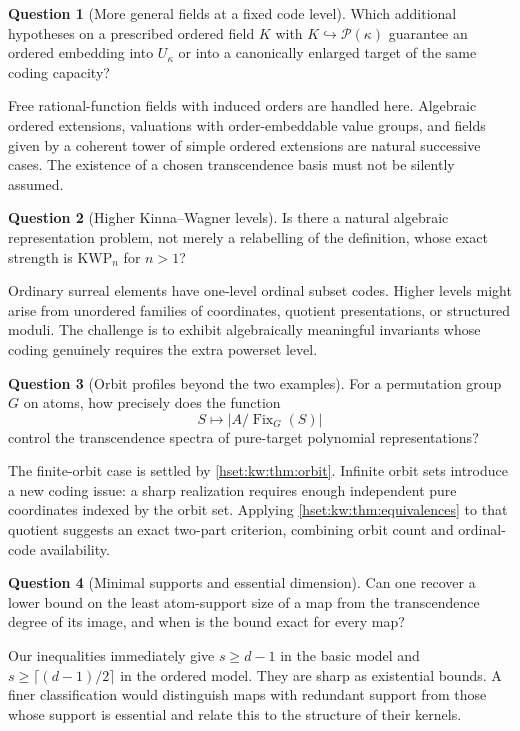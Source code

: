 \documentclass[11pt,letterpaper]{article}
\theoremstyle{definition}
\newtheorem{question}[question]{Question}\aliascntresetthe{question}
\theoremstyle{remark}
\newcommand{\Pow}{\mathcal P}
\newcommand{\KWP}{\mathrm{KWP}}
\newcommand{\Fix}{\operatorname{Fix}}
\begin{document}
\begin{question}[More general fields at a fixed code level]\label{hset:kw:q:fields}
Which additional hypotheses on a prescribed ordered field $K$ with $K\hookrightarrow\Pow(\kappa)$ guarantee an ordered embedding into $U_\kappa$ or into a canonically enlarged target of the same coding capacity?
\end{question}
Free rational-function fields with induced orders are handled here. Algebraic ordered extensions, valuations with order-embeddable value groups, and fields given by a coherent tower of simple ordered extensions are natural successive cases. The existence of a chosen transcendence basis must not be silently assumed.

\begin{question}[Higher Kinna--Wagner levels]\label{hset:kw:q:higherkw}
Is there a natural algebraic representation problem, not merely a relabelling of the definition, whose exact strength is $\KWP_n$ for $n>1$?
\end{question}
Ordinary surreal elements have one-level ordinal subset codes. Higher levels might arise from unordered families of coordinates, quotient presentations, or structured moduli. The challenge is to exhibit algebraically meaningful invariants whose coding genuinely requires the extra powerset level.

\begin{question}[Orbit profiles beyond the two examples]\label{hset:kw:q:orbitprofiles}
For a permutation group $G$ on atoms, how precisely does the function
\[
S\longmapsto |A/\Fix_G(S)|
\]
control the transcendence spectra of pure-target polynomial representations?
\end{question}
The finite-orbit case is settled by \cref{hset:kw:thm:orbit}. Infinite orbit sets introduce a new coding issue: a sharp realization requires enough independent pure coordinates indexed by the orbit set. Applying \cref{hset:kw:thm:equivalences} to that quotient suggests an exact two-part criterion, combining orbit count and ordinal-code availability.

\begin{question}[Minimal supports and essential dimension]\label{hset:kw:q:minimalsupports}
Can one recover a lower bound on the least atom-support size of a map from the transcendence degree of its image, and when is the bound exact for every map?
\end{question}
Our inequalities immediately give $s\ge d-1$ in the basic model and $s\ge\lceil(d-1)/2\rceil$ in the ordered model. They are sharp as existential bounds. A finer classification would distinguish maps with redundant support from those whose support is essential and relate this to the structure of their kernels.
\end{document}
